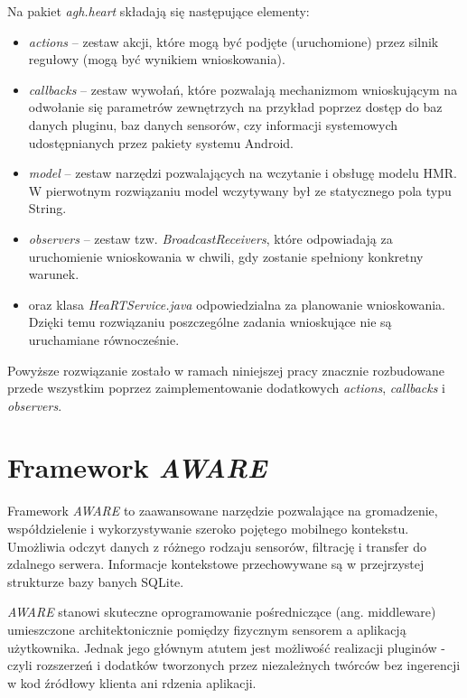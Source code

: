 Na pakiet \textit{agh.heart} składają się następujące elementy:
\begin{itemize}
	\item \textit{actions} -- zestaw akcji, które mogą być podjęte (uruchomione) przez silnik regułowy (mogą być wynikiem wnioskowania).
	
	\item \textit{callbacks} -- zestaw wywołań, które pozwalają mechanizmom wnioskującym na odwołanie się parametrów zewnętrzych na przykład poprzez dostęp do baz danych pluginu, baz danych sensorów, czy informacji systemowych udostępnianych przez pakiety systemu Android.
	
	\item \textit{model} -- zestaw narzędzi pozwalających na wczytanie i obsługę modelu HMR. W pierwotnym rozwiązaniu model wczytywany był ze statycznego pola typu String.
	
	\item \textit{observers} -- zestaw tzw. \textit{BroadcastReceivers}, które odpowiadają za uruchomienie wnioskowania w chwili, gdy zostanie spełniony konkretny warunek.
	
	\item oraz klasa \textit{HeaRTService.java} odpowiedzialna za planowanie wnioskowania. Dzięki temu rozwiązaniu poszczególne zadania wnioskujące nie są uruchamiane równocześnie\cite{heartaware}.
\end{itemize}

Powyższe rozwiązanie zostało w ramach niniejszej pracy znacznie rozbudowane przede wszystkim poprzez zaimplementowanie dodatkowych \textit{actions}, \textit{callbacks} i \textit{observers}.


\section{Framework \textit{AWARE}}
\label{sec:frameworkAware}

Framework \textit{AWARE} to zaawansowane narzędzie pozwalające na gromadzenie, współdzielenie i wykorzystywanie szeroko pojętego mobilnego kontekstu. Umożliwia odczyt danych z różnego rodzaju sensorów, filtrację i transfer do zdalnego serwera. Informacje kontekstowe przechowywane są w przejrzystej strukturze bazy banych SQLite. 

\textit{AWARE} stanowi skuteczne oprogramowanie pośredniczące (ang. middleware) umieszczone architektonicznie pomiędzy fizycznym sensorem a aplikacją użytkownika. Jednak jego głównym atutem jest możliwość realizacji pluginów - czyli rozszerzeń i dodatków tworzonych przez niezależnych twórców bez ingerencji w kod źródłowy klienta ani rdzenia aplikacji\cite{AwareFramework}. 


